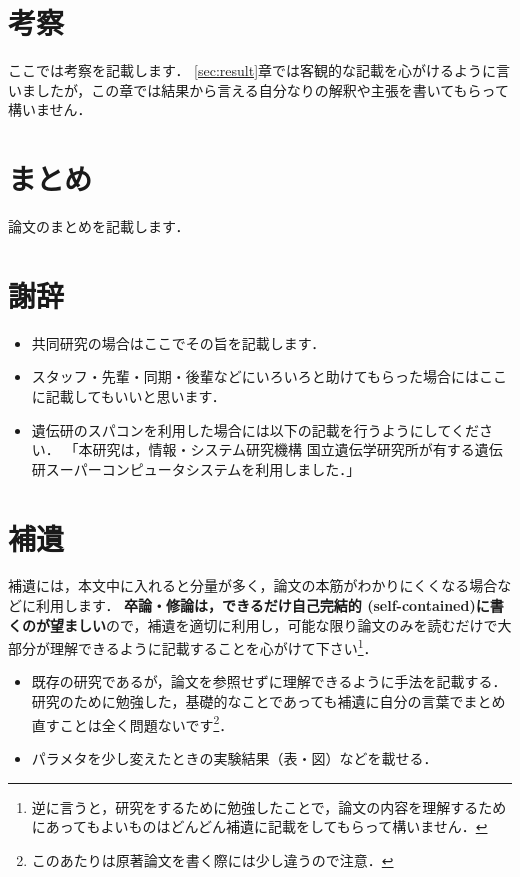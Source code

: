 \documentclass[dvipdfmx,autodetect-engine]{jsreport}
\begin{document}
\chapter{考察}

ここでは考察を記載します．
\ref{sec:result}章では客観的な記載を心がけるように言いましたが，この章では結果から言える自分なりの解釈や主張を書いてもらって構いません．

\chapter{まとめ}

論文のまとめを記載します．

\chapter*{謝辞}

\begin{itemize}
\item 共同研究の場合はここでその旨を記載します．
\item スタッフ・先輩・同期・後輩などにいろいろと助けてもらった場合にはここに記載してもいいと思います．
\item 遺伝研のスパコンを利用した場合には以下の記載を行うようにしてください．
「本研究は，情報・システム研究機構 国立遺伝学研究所が有する遺伝研スーパーコンピュータシステムを利用しました．」
\end{itemize}




\clearpage

\appendix 

\chapter{補遺}

補遺には，本文中に入れると分量が多く，論文の本筋がわかりにくくなる場合などに利用します．
\textbf{卒論・修論は，できるだけ自己完結的 (self-contained)に書くのが望ましい}ので，補遺を適切に利用し，可能な限り論文のみを読むだけで大部分が理解できるように記載することを心がけて下さい\footnote{逆に言うと，研究をするために勉強したことで，論文の内容を理解するためにあってもよいものはどんどん補遺に記載をしてもらって構いません．}．
\begin{itemize}
\item 既存の研究であるが，論文を参照せずに理解できるように手法を記載する．研究のために勉強した，基礎的なことであっても補遺に自分の言葉でまとめ直すことは全く問題ないです\footnote{このあたりは原著論文を書く際には少し違うので注意．}．
\item パラメタを少し変えたときの実験結果（表・図）などを載せる．
\end{itemize}
\end{document}
